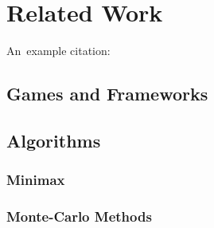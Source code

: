 \chapter{Related Work}

An~example citation: \cite{Andel07}

\section{Games and Frameworks}

\section{Algorithms}

\subsection{Minimax}

\subsection{Monte-Carlo Methods}
